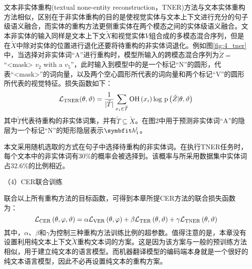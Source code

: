 
文本非实体重构(textual none-entity reconstruction，TNER)方法与文本实体重构方法相似，区别在于非实体重构的目的是使视觉实体与文本上下文进行充分的句子级语义融合，而实体的重构方法更侧重实体在两个模态之间的实体级语义融合。文本非实体的输入同样是文本上下文$\tilde{X}$和视觉实体$V$组合成的多模态混合序列，但是在$\tilde{X}$中除对实体的位置进行退化还要将待重构的非实体词退化。例如图\ref{fig:4_tner}中，当选择对非实体词“A”进行重构时，模型所输入的跨模态混合序列为$\tilde{Z}=$“<mask> $v_2$ with a $v_5$”，此时输入到模型中的是一个标记“N”的圆形，代表“<mask>”的词向量，以及两个空心圆形所代表的词向量和两个标记“V”的圆形所代表的视觉特征。损失函数如下：
\begin{equation}
\mathcal{L}_{\rm{TNER}}(\theta, \vartheta) =
    \frac{1}{{\vert}\tilde{T}{\vert}}
    \mathop{\sum}_{x_i \in \tilde{T}}
    {\rm{OH}} \left( x_i \right)
    {\rm log}{\ }{\rm p} \left( \tilde{Z} {\vert} \theta, \vartheta \right)
\end{equation}
其中$\tilde{T}$代表待重构的非实体词集，并有$\tilde{T}\subseteq \tilde{X}$。在图2中用于预测非实体词“A”的隐层为一个标记“N”的矩形隐层表示$\Vector{h_1^l}$。

本文采用随机选取的方式在句子中选择待重构的非实体词。在执行TNER任务时，每个文本中的非实体词有$30\%$的概率会被选择到。该概率与所采用数据集中实体词占$32.6\%$的比例相近。

{\sffamily （4）CER联合训练}

联合以上所有重构方法的目标函数，可得到本章所提CER方法的联合损失函数为：
\begin{equation}
\mathcal{L}_{\rm{CER}} \left( \theta, \varphi, \vartheta \right) = \alpha \mathcal{L}_{\rm{VER}} \left( \theta, \varphi \right) + \beta \mathcal{L}_{\rm{TER}} \left( \theta, \vartheta \right) + \gamma \mathcal{L}_{\rm{TNER}} \left( \theta, \vartheta \right)
\label{eq:4_combined_cer}
\end{equation}
其中，$\alpha$、$\beta$和$\gamma$为控制三种重构方法训练比例的超参数。值得注意的是，本章没有设置利用纯文本上下文$\tilde{X}$重构文本词的方案。这是因为该方案与一般的预训练方法相似，用于建立纯文本的语言模型。而机器翻译模型的编码端本身就是一个很好的纯文本语言模型，因此不必再设置纯文本的重构方案。

